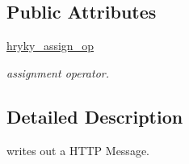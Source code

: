 \subsection*{Public Attributes}
\begin{DoxyCompactItemize}
\item 
\hypertarget{classhryky_1_1http_1_1_parser_a155f49c5464407ae0321acbd7a55a413}{\hyperlink{classhryky_1_1http_1_1_parser_a155f49c5464407ae0321acbd7a55a413}{hryky\-\_\-assign\-\_\-op}}\label{classhryky_1_1http_1_1_parser_a155f49c5464407ae0321acbd7a55a413}

\begin{DoxyCompactList}\small\item\em assignment operator. \end{DoxyCompactList}\end{DoxyCompactItemize}


\subsection{Detailed Description}
writes out a H\-T\-T\-P Message. 


